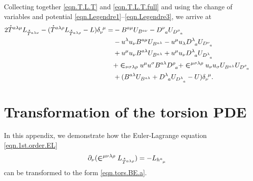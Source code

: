 \documentclass[
10pt, %
a4paper, %
oneside, %
headinclude,footinclude, %
BCOR5mm, %
]{scrartcl}
\newcommand{\tetrsymbol}{h}
\newcommand{\tetr}[2]{\tetrsymbol^{#1}_{\phantom{#1}#2}}
\newcommand{\D}[1]{\partial_{#1}} %
\newcommand{\Dm}[2]{D_{\phantom{#2}#1}^{#2}}	%
\newcommand{\Bm}[2]{B^{#1#2}}	%
\newcommand{\Laghodge}{L}%
\newcommand{\Um}{U}%
\newcommand{\LCsymb}{\bm{\in}}    %
\newcommand{\HDT}[1]{\accentset{\star}{T}^{#1}}
\newcommand{\KD}[2]{\delta^{\ #1}_{#2}}
\newcommand{\projector}[2]{\Delta^{#1}_{\ #2}}
\begin{document}
Collecting together \eqref{eqn.T.L.T} and \eqref{eqn.T.L.T.full} and using the change of 
variables and potential \eqref{eqn.Legendre1}--\eqref{eqn.Legendre3}, we arrive at
\begin{align}\label{eqn.Sigma.tors.part}
	2 \HDT{a\lambda\mu}L_{\HDT{a\lambda\nu}} - 
	(\HDT{a\lambda\rho}L_{\HDT{a\lambda\rho}} - L) \KD{\mu}{\nu} =
	& - \Bm{a}{\mu}\Um_{\Bm{a}{\nu}} - \Dm{a}{\nu}\Um_{\Dm{a}{\mu}} \\
	& - u^\lambda u_\nu \Bm{a}{\mu} \Um_{\Bm{a}{\lambda}} - u^\mu u_\lambda \Dm{a}{\lambda} 
		\Um_{\Dm{a}{\nu}}				\nonumber\\
	& + u^\mu u_\nu \Bm{a}{\lambda} \Um_{\Bm{a}{\lambda}} 
	  + u^\mu u_\nu \Dm{a}{\lambda} \Um_{\Dm{a}{\lambda}}
	  \nonumber \\
	& + \LCsymb_{\nu\sigma\lambda\rho} u^\mu u^\sigma \Bm{a}{\lambda} \Dm{a}{\rho} 
	  + \LCsymb^{\mu\sigma\lambda\rho} u_\nu u_\sigma \Um_{\Bm{a}{\lambda}} 
	  \Um_{\Dm{a}{\rho}} 
	  \nonumber \\
	& + (\Bm{a}{\lambda} \Um_{\Bm{a}{\lambda}} + \Dm{a}{\lambda} \Um_{\Dm{a}{\lambda}} - 
	\Um) \KD{\mu}{\nu}. \nonumber
\end{align}







\section{Transformation of the torsion PDE}\label{app.sec.Deqn}


In this appendix, we demonstrate how the Euler-Lagrange equation \eqref{eqn.1st.order.EL} 
\begin{equation}\label{eqn.EL.tors}
	\D{\nu}(\LCsymb^{\mu\nu\lambda\rho}\Laghodge_{\HDT{a\lambda\rho}}) 
	=-\Laghodge_{\tetr{a}{\mu}}
\end{equation}
can be 
transformed to the form \eqref{eqn.tors.BE.a}.
\end{document}

